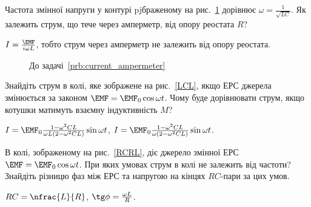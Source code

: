 \begin{problem}\label{prb:current_ampermeter}
Частота змінної напруги у контурі pjбраженому на рис.~\ref{current_ampermeter} дорівнює $\omega = \frac{1}{\sqrt{LC}}$. Як залежить струм, що тече через амперметр, від опору реостата $R$?
\begin{solution}
	$I = \frac{\EMF}{i\omega L}$, тобто струм через амперметр не залежить від опору реостата.
\end{solution}
\end{problem}
\begin{figure}[h!]\centering
\caption{До задачі~\ref{prb:current_ampermeter}}
\label{current_ampermeter}
\end{figure}

\begin{problem}\label{prb:LCL}%
Знайдіть струм в колі, яке зображене на рис.~\ref{LCL}, якщо ЕРС джерела змінюється за законом $\EMF = \EMF_0\cos\omega t$. Чому буде дорівнювати струм, якщо котушки матимуть взаємну індуктивність $M$?
\begin{solution}
	$I = \EMF_0\frac{1 - \omega^2CL}{\omega L(2 - \omega^2CL)}\sin\omega t$, $I = \EMF_0\frac{1 - \omega^2CL}{\omega(2 - \omega^2CL)}\sin\omega t$.
\end{solution}
\end{problem}

\begin{problem}\label{prb:RCRL}%
В колі, зображеному на рис.~\ref{RCRL}, діє джерело змінної ЕРС  $\EMF = \EMF_0\cos\omega t$. При яких умовах струм в колі не залежить від частоти? Знайдіть різницю фаз між ЕРС та напругою на кінцях $RC$-пари за цих умов.
\begin{solution}
	$RC = \nfrac{L}{R}$, $\tg\phi = \frac{\omega L}{R}$.
\end{solution}
\end{problem}

